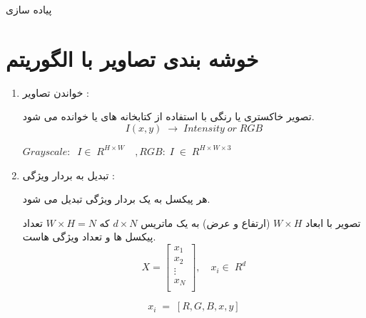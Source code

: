 \documentclass[10pt]{beamer}
\begin{document}
\begin{frame}{پیاده سازی}
	
	\section{خوشه بندی تصاویر  با الگوریتم }
\begin{footnotesize}
\begin{enumerate}
	\item 
	خواندن تصاویر :
	
	تصویر خاکستری یا رنگی با استفاده از کتابخانه های  یا  خوانده می شود.
\[
	I(x,y) \; \rightarrow \; Intensity \; or \; RGB
\]
\begin{center}
\begin{scriptsize}
 $Grayscale:\; \; I \in \; R^{H \times W} \quad ,RGB:\; I \; \in \; R^{H \times W \times3}$ 
\end{scriptsize}
\end{center}

	\item 
	تبدیل به بردار ویژگی :
	
	هر پیکسل به یک بردار ویژگی تبدیل می شود.
	
تصویر با ابعاد $W \times H$ (ارتفاع و عرض) به یک ماتریس $d \times N$ که $W \times H = N$ تعداد پیکسل ها و  تعداد ویژگی هاست.
\[X=
 \begin{bmatrix}
	x_1\\
	x_2\\
	\vdots\\
	x_N\\
\end{bmatrix}
, \quad x_i \in \; R^d \]

\[x_i \; = \; [R,G,B,x,y]\]
\end{enumerate}
\end{footnotesize}
\end{frame}
\end{document}
